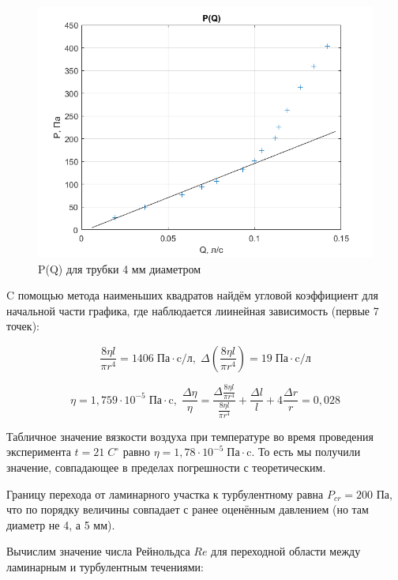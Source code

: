 \documentclass[a4paper, 12pt]{article} %
\begin{document}
\begin{figure}[!h]
    \centering
    \includegraphics[width = 12 cm]{4mm}
    \caption{P(Q) для трубки 4 мм диаметром}
    \label{fig:vac}
\end{figure}

C помощью метода наименьших квадратов найдём угловой коэффициент для начальной части графика, где наблюдается лиинейная зависимость (первые 7 точек):

\begin{equation}
	\frac{8\eta l}{\pi r^4} = 1406 \; \text{Па} \cdot \text{c/л}, \; \Delta \left( \frac{8\eta l}{\pi r^4} \right) = 19 \; \text{Па} \cdot \text{c/л}
\end{equation}

\begin{equation}
	\eta = 1,759 \cdot 10^{-5} \; \text{Па} \cdot \text{c}, \; \frac{\Delta \eta}{\eta} = \frac{\Delta \frac{8\eta l}{\pi r^4}}{\frac{8\eta l}{\pi r^4}} +  \frac{\Delta l}{l} + 4 \frac{\Delta r}{r} = 0,028
\end{equation}

Табличное значение вязкости воздуха при температуре во время проведения эксперимента $t = 21 \; C^{\circ}$ равно $\eta = 1,78 \cdot 10^{-5} \; \text{Па} \cdot \text{c}$. То есть мы получили значение, совпадающее в пределах погрешности с теоретическим.

Границу перехода от ламинарного участка к турбулентному равна $P_{cr} = 200$ Па, что по порядку величины совпадает с ранее оценённым давлением (но там диаметр не 4, а 5 мм).

Вычислим значение числа Рейнольдса $Re$ для переходной области между ламинарным и турбулентным течениями:
\end{document}

